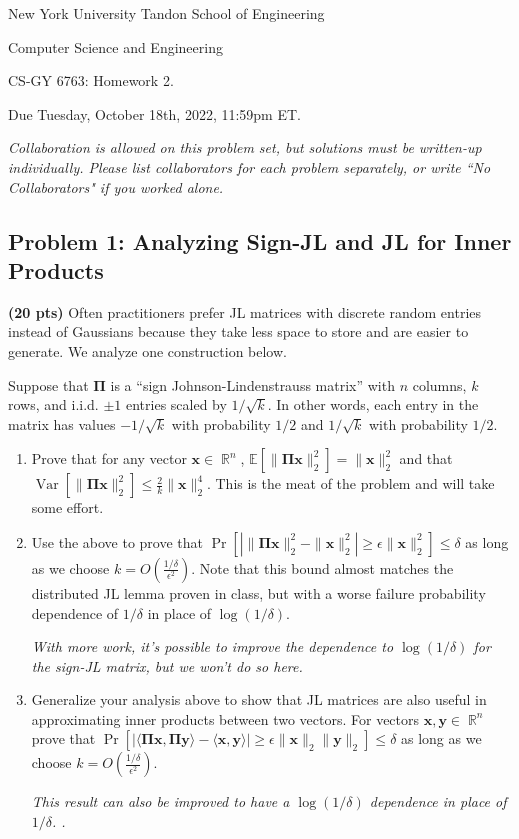 \documentclass[10pt]{article}
\DeclareMathOperator{\R}{\mathbb{R}}
\newcommand{\E}{\mathbb{E}}
\DeclareMathOperator{\Var}{Var}
\newcommand{\bs}[1]{\boldsymbol{#1}}
\newcommand{\bv}[1]{\mathbf{#1}}
\begin{document}
	
\begin{center}
	\normalsize
	New York University Tandon School of Engineering
	
	Computer Science and Engineering
	\medskip
	
	\large
	CS-GY 6763: Homework 2. 
	
	Due Tuesday, October 18th, 2022, 11:59pm ET.
	\medskip
	
	\normalsize 
	\noindent \emph{Collaboration is allowed on this problem set, but solutions must be written-up individually. Please list collaborators for each problem separately, or write ``No Collaborators" if you worked alone.}

\end{center} 

\subsection{Problem 1: Analyzing Sign-JL and JL for Inner Products }
\textbf{(20 pts)}
Often practitioners prefer JL matrices with discrete random entries instead of Gaussians because they take less space to store and are easier to generate. We  analyze one construction below.

Suppose that $\bs{\Pi}$ is a ``sign Johnson-Lindenstrauss matrix'' with $n$ columns, $k$ rows, and i.i.d. $\pm 1$ entries scaled by $1/\sqrt{k}$. In other words, each entry in the matrix has values $-1/\sqrt{k}$ with probability $1/2$ and $1/\sqrt{k}$ with probability $1/2$.
\begin{enumerate}
	\item Prove that for any vector $\bv{x}\in \R^n$, $\E[\|\bs{\Pi}\bv{x}\|_2^2] = \|\bv{x}\|_2^2$ and that $\Var[\|\bs{\Pi}\bv{x}\|_2^2] \leq \frac{2}{k}\|\bv{x}\|_2^4$. This is the meat of the problem and will take some effort. 
	\vspace{.5em}

	
	\item Use the above to prove that $\Pr\left[\left|\|\bs{\Pi}\bv{x}\|_2^2 - \|\bv{x}\|_2^2\right| \geq \epsilon\|\bv{x}\|_2^2 \right] \leq \delta$ as long as we choose $k = O\left(\frac{1/\delta}{\epsilon^2}\right)$. Note that this bound almost matches the distributed JL lemma proven in class, but with a worse failure probability dependence of $1/\delta$ in place of $\log(1/\delta)$. 
	\vspace{.5em}
	
	\textit{With more work, it's possible to improve the dependence to $\log(1/\delta)$ for the sign-JL matrix, but we won't do so here.}
	
	\item Generalize your analysis above to show that JL matrices are also useful in approximating inner products between two vectors. For vectors $\bv{x},\bv{y}\in \R^n$ prove that $\Pr\left[\left|\langle \bs{\Pi}\bv{x}, \bs{\Pi}\bv{y}\rangle -  \langle  \bv{x}, \bv{y}\rangle\right| \geq \epsilon\|\bv{x}\|_2\|\bv{y}\|_2\right] \leq \delta$ as long as we choose $k = O\left(\frac{1/\delta}{\epsilon^2}\right)$.
	
		\textit{This result can also be improved to have a $\log(1/\delta)$ dependence in place of $1/\delta$. .}
\end{enumerate}
\end{document}
